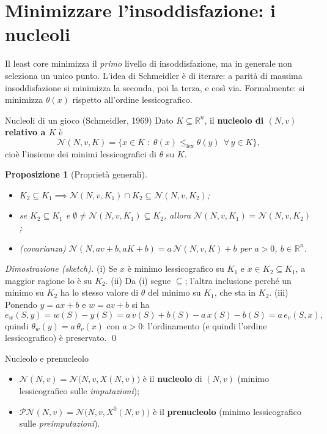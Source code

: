 \documentclass[12pt,a4paper,twoside]{book}
\theoremstyle{plain}
\newtheorem{proposition}[theorem]{Proposizione}
\theoremstyle{definition}
\begin{document}
\section{Minimizzare l'insoddisfazione: i nucleoli}

Il least core minimizza il \emph{primo} livello di insoddisfazione, ma in
generale non seleziona un unico punto. L'idea di Schmeidler è di iterare:
a parità di massima insoddisfazione si minimizza la seconda, poi la terza, e
così via. Formalmente: si minimizza $\theta(x)$ rispetto all'ordine
lessicografico.

\begin{defbox}{Nucleoli di un gioco (Schmeidler, 1969)}
Dato $K\subseteq\mathbb{R}^n$, il \textbf{nucleolo di $(N,v)$ relativo a $K$} è
\[
  \mathcal{N}(N,v,K)=\{x\in K\;:\;\theta(x)\le_{\mathrm{lex}}\theta(y)\ \ \forall\,y\in K\},
\]
cioè l'insieme dei minimi lessicografici di $\theta$ su $K$.
\end{defbox}

\begin{proposition}[Proprietà generali]
\begin{itemize}
  \item[(i)] $K_2\subseteq K_1\implies \mathcal{N}(N,v,K_1)\cap K_2\subseteq \mathcal{N}(N,v,K_2)$;
  \item[(ii)] se $K_2\subseteq K_1$ e $\emptyset\ne\mathcal{N}(N,v,K_1)\subseteq K_2$, allora
        $\mathcal{N}(N,v,K_1)=\mathcal{N}(N,v,K_2)$;
  \item[(iii)] (covarianza) $\mathcal{N}(N,av+b,aK+b)=a\,\mathcal{N}(N,v,K)+b$ per $a>0$, $b\in\mathbb{R}^n$.
\end{itemize}
\end{proposition}

\textit{Dimostrazione (sketch).} (i) Se $x$ è minimo lessicografico su $K_1$ e
$x\in K_2\subseteq K_1$, a maggior ragione lo è su $K_2$. (ii) Da (i) segue
$\subseteq$; l'altra inclusione perché un minimo su $K_2$ ha lo stesso valore di
$\theta$ del minimo su $K_1$, che sta in $K_2$. (iii) Ponendo $y=ax+b$ e
$w=av+b$ si ha
\[
  e_w(S,y)=w(S)-y(S)=a\,v(S)+b(S)-a\,x(S)-b(S)=a\,e_v(S,x),
\]
quindi $\theta_w(y)=a\,\theta_v(x)$ con $a>0$: l'ordinamento (e quindi l'ordine
lessicografico) è preservato. \qed

\begin{defbox}{Nucleolo e prenucleolo}
\begin{itemize}
  \item $\mathcal{N}(N,v)=\mathcal{N}\bigl(N,v,X(N,v)\bigr)$ è il \textbf{nucleolo} di $(N,v)$
        (minimo lessicografico sulle \emph{imputazioni});
  \item $\mathcal{PN}(N,v)=\mathcal{N}\bigl(N,v,X^{0}(N,v)\bigr)$ è il \textbf{prenucleolo}
        (minimo lessicografico sulle \emph{preimputazioni}).
\end{itemize}
\end{defbox}
\end{document}
